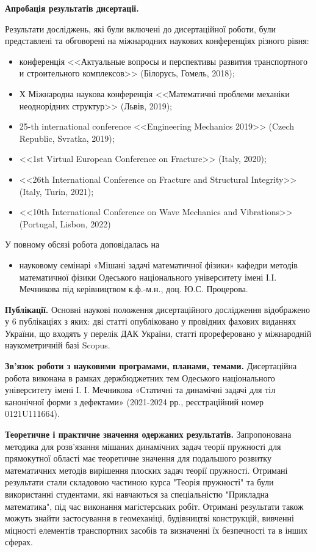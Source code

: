 \textbf{Апробація результатів дисертації.}

Результати досліджень, які були включені до дисертаційної роботи, були представлені та обговорені на міжнародних наукових конференціях різного рівня:
\begin{itemize}
    \item конференція  <<Актуальные вопросы и перспективы развития транспортного и строительного комплексов>> (Білорусь, Гомель, 2018);
    \item Х Міжнародна наукова конференція <<Математичні проблеми механіки неоднорідних структур>> (Львів, 2019);
    \item 25-th international conference <<Engineering Mechanics 2019>> (Czech Republic, Svratka, 2019);
    \item <<1st Virtual European Conference on Fracture>> (Italy, 2020);
    \item <<26th International Conference on Fracture and Structural Integrity>> (Italy, Turin, 2021);
    \item <<10th International Conference on Wave Mechanics and Vibrations>> (Portugal, Lisbon, 2022)
\end{itemize}

У повному обсязі робота доповідалась на
\begin{itemize}
    \item науковому семінарі «Мішані задачі математичної фізики» кафедри методів
    математичної фізики Одеського національного університету імені І.І. Мечникова під керівництвом к.ф.-м.н., доц. Ю.С. Процерова.
\end{itemize}

\textbf{Публікації.}
Основні наукові положення дисертаційного дослідження відображено у 6 публікаціях з яких:
дві статті \cite{pozhylenkov_2,pozhylenkov_3} опубліковано у провідних фахових виданнях України, що входять у перелік ДАК України,
статті \cite{pozhylenkov_1,pozhylenkov_4,pozhylenkov_5,pozhylenkov_6} прореферовано у міжнародній наукометричній базі Scopus.

\textbf{Зв’язок роботи з науковими програмами, планами, темами.}
Дисертаційна робота виконана в рамках держбюджетних тем Одеського національного університету імені І. І. Мечникова
«Статичні та динамічні задачі для тіл канонічної форми з дефектами»
(2021-2024 рр., реєстраційний номер 0121U111664).

\textbf{Теоретичне і практичне значення одержаних результатів.} 
Запропонована методика для розв'язання мішаних динамічних задач теорії пружності для прямокутної області має теоретичне значення для подальшого розвитку математичних методів вирішення плоских задач теорії пружності.
Отримані результати стали складовою частиною курса "Теорія пружності" та були використанні студентами, які навчаються за спеціальністю "Прикладна математика", під час виконання магістерських робіт.
Отримані результати також можуть знайти застосування в геомеханіці, будівництві конструкцій, вивченні міцності елементів транспортних засобів та визначенні їх безпечності та в інших сферах.

